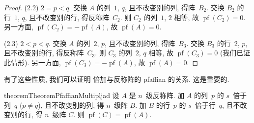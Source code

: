 \documentclass[../libro.tex]{subfiles}
\begin{document}
\begin{proof}
    (2.2)
    \(2 = p < q\).
    交换 \(A\) 的列~\(1\), \(q\), 且不改变别的列, 得阵~\(B_2\).
    交换 \(B_2\) 的行~\(1\), \(q\), 且不改变别的行,
    得反称阵~\(C_2\).
    则 \(C_2\) 的列~\(1\), \(2\) 相等,
    故 \(\operatorname{pf} {(C_2)} = 0\).
    另一方面, \(\operatorname{pf} {(C_2)}
    = -\operatorname{pf} {(A)}\),
    故 \(\operatorname{pf} {(A)} = 0\).

    (2.3)
    \(2 < p < q\).
    交换 \(A\) 的列~\(2\), \(p\), 且不改变别的列, 得阵~\(B_3\).
    交换 \(B_3\) 的行~\(2\), \(p\), 且不改变别的行,
    得反称阵~\(C_3\).
    则 \(C_3\) 的列~\(2\), \(q\) 相等,
    故 \(\operatorname{pf} {(C_3)} = 0\)
    (我们已证此情形).
    另一方面, \(\operatorname{pf} {(C_3)}
    = -\operatorname{pf} {(A)}\),
    故 \(\operatorname{pf} {(A)} = 0\).
\end{proof}

有了这些性质, 我们可以证明%
倍加与反称阵的 pfaffian 的关系.
这是重要的.

\begin{restatable}{theorem}{TheoremPfaffianMultipljad}
    设 \(A\) 是 \(n\)~级反称阵.
    加 \(A\) 的列~\(p\) 的 \(s\)~倍于列~\(q\)
    (\(p \neq q\)),
    且不改变别的列, 得 \(n\)~级阵 \(B\).
    加 \(B\) 的行~\(p\) 的 \(s\)~倍于行~\(q\),
    且不改变别的行, 得 \(n\)~级阵 \(C\).
    则 \(\operatorname{pf} {(C)} = \operatorname{pf} {(A)}\).
\end{restatable}
\end{document}
